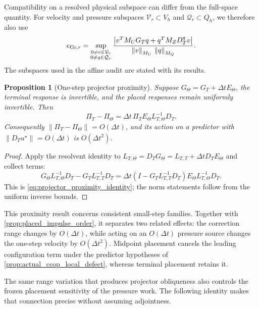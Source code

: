 \documentclass[11pt]{article}
\theoremstyle{plain}
\newtheorem{proposition}[theorem]{Proposition}
\theoremstyle{definition}
\theoremstyle{remark}
\newcommand{\dt}{\Delta t}
\newcommand{\Th}{\Theta}
\newcommand{\norm}[2][]{\left\lVert #2\right\rVert_{#1}}
\begin{document}
Compatibility on a resolved physical subspace can differ from the full-space
quantity.  For velocity and pressure subspaces
$\mathcal V_r\subset V_h$ and $\mathcal Q_r\subset Q_h$, we therefore also use
\begin{equation}
 e_{{\rm Gr},r}
 =\sup_{\substack{0\ne v\in\mathcal V_r\\0\ne q\in\mathcal Q_r}}
 \frac{\left|v^TM_UG_Tq+q^TM_ZD_T^qv\right|}
      {\norm[M_U]{v}\,\norm[M_Q]{q}}.
 \label{eq:restricted_green_compatibility}
\end{equation}
The subspaces used in the affine audit are stated with its results.

\begin{proposition}[One-step projector proximity]
\label{prop:projector_proximity}
Suppose $G_\Th=G_T+\dt E_\Th$, the terminal response is invertible, and the
placed responses remain uniformly invertible.  Then
\begin{equation}
 \Pi_T-\Pi_\Th
 =\dt\,\Pi_T E_\Th L_{T,\Th}^{-1}D_T.
 \label{eq:projector_proximity_identity}
\end{equation}
Consequently $\norm{\Pi_T-\Pi_\Th}=O(\dt)$, and its action on a predictor
with $\norm{D_Tu^\star}=O(\dt)$ is $O(\dt^2)$.
\end{proposition}

\begin{proof}
Apply the resolvent identity to
$L_{T,\Th}=D_TG_\Th=L_{T,T}+\dt D_TE_\Th$ and collect terms:
\[
 G_\Th L_{T,\Th}^{-1}D_T-G_TL_{T,T}^{-1}D_T
 =\dt(I-G_TL_{T,T}^{-1}D_T)E_\Th L_{T,\Th}^{-1}D_T.
\]
This is \eqref{eq:projector_proximity_identity}; the norm statements follow
from the uniform inverse bounds.
\end{proof}

This proximity result concerns consistent small-step families.  Together with
\cref{prop:placed_impulse_order}, it separates two related effects: the
correction range changes by $O(\dt)$, while acting on an $O(\dt)$ pressure
source changes the one-step velocity by $O(\dt^2)$.  Midpoint placement
cancels the leading configuration term under the predictor hypotheses of
\cref{prop:actual_ccop_local_defect}, whereas terminal placement retains it.

The same range variation that produces projector obliqueness also controls the
frozen placement sensitivity of the pressure work.  The following identity
makes that connection precise without assuming adjointness.
\end{document}
